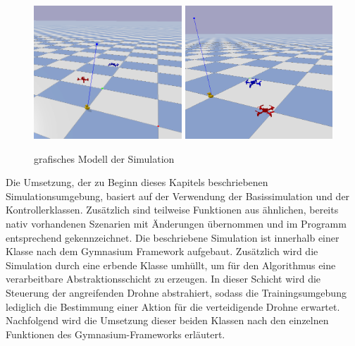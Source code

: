 \begin{figure}[htb]
    \centering
    \includegraphics[height=5cm]{lib/graphics/drone_sim.png}
    \includegraphics[height=5cm]{lib/graphics/drone_sim2.png}
    \caption[grafisches Modell der Simulation]{grafisches Modell der Simulation\footnotemark}
    \label{abb:simenv model}
\end{figure}


Die Umsetzung, der zu Beginn dieses Kapitels beschriebenen Simulationsumgebung, basiert auf der Verwendung der Basissimulation und der Kontrollerklassen. 
Zusätzlich sind teilweise Funktionen aus ähnlichen, bereits nativ vorhandenen Szenarien mit Änderungen übernommen und im Programm entsprechend gekennzeichnet.
Die beschriebene Simulation ist innerhalb einer Klasse nach dem Gymnasium Framework aufgebaut.
Zusätzlich wird die Simulation durch eine erbende Klasse umhüllt, um für den Algorithmus eine verarbeitbare Abstraktionsschicht zu erzeugen.
In dieser Schicht wird die Steuerung der angreifenden Drohne abstrahiert, sodass die Trainingsumgebung lediglich die Bestimmung einer Aktion für die verteidigende Drohne erwartet.
Nachfolgend wird die Umsetzung dieser beiden Klassen nach den einzelnen Funktionen des Gymnasium-Frameworks erläutert.

